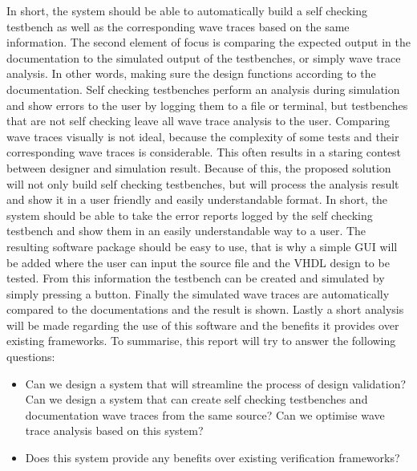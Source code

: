 \npar
In short, the system should be able to automatically build a self checking testbench as well as the corresponding wave traces based on the same information.
\npar
The second element of focus is comparing the expected output in the documentation to the simulated output of the testbenches, or simply wave trace analysis. In other words, making sure the design functions according to the documentation. Self checking testbenches perform an analysis during simulation and show errors to the user by logging them to a file or terminal, but testbenches that are not self checking leave all wave trace analysis to the user. Comparing wave traces visually is not ideal, because the complexity of some tests and their corresponding wave traces is considerable. This often results in a staring contest between designer and simulation result. Because of this, the proposed solution will not only build self checking testbenches, but will process the analysis result and show it in a user friendly and easily understandable format. 
\npar
In short, the system should be able to take the error reports logged by the self checking testbench and show them in an easily understandable way to a user.
\npar
The resulting software package should be easy to use, that is why a simple GUI will be added where the user can input the source file and the VHDL design to be tested. From this information the testbench can be created and simulated by simply pressing a button. Finally the simulated wave traces are automatically compared to the documentations and the result is shown.
\npar
Lastly a short analysis will be made regarding the use of this software and the benefits it provides over existing frameworks.
\newpage
To summarise, this report will try to answer the following questions:
\begin{itemize}
	\item Can we design a system that will streamline the process of design validation?
	\subitem Can we design a system that can create self checking testbenches and
	\subsubitem documentation wave traces from the same source?
	\subitem Can we optimise wave trace analysis based on this system?
	\item Does this system provide any benefits over existing verification frameworks?	
\end{itemize}
